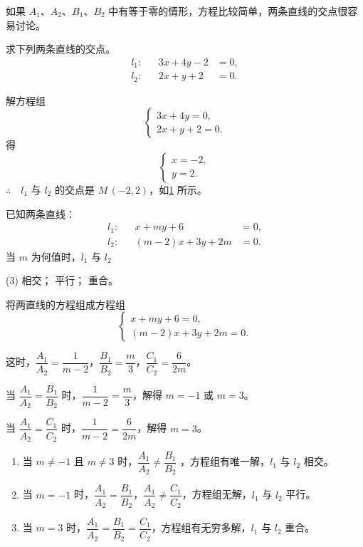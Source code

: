 \bigskip 如果 $A_1$、$A_2$、$B_1$、$B_2$ 中有等于零的情形，方程比较简单，两条直线的交点很容易讨论。
\begin{example}
  求下列两条直线的交点。
  \begin{align*}
    l_1:&&3x+4y-2 & = 0,\\
    l_2:&&2x+y+2 & = 0.
  \end{align*}
\end{example}
\begin{solution}
  解方程组
  \[\begin{cases} 3x+4y=0,\\2x+y+2=0. \end{cases}\]
  得
  \[\begin{cases} x=-2,\\y=2. \end{cases}\]
  $\therefore \quad l_1$ 与 $l_2$ 的交点是 $M\,(-2,2)$，如\cref{fig:1-33} 所示。
\end{solution}
\begin{figure}
  \caption{}\label{fig:1-33}
\end{figure}
\begin{example}
  已知两条直线：
  \begin{align*}
    l_1:&&x+my+6 & = 0,\\
    l_2:&&(m-2)x+3y+2m & = 0.
  \end{align*}
  当 $m$ 为何值时，${l}_{1}$ 与 ${l}_{2}$ 
  \begin{tasks}(3)
    \task 相交；
    \task 平行；
    \task 重合。
  \end{tasks}
\end{example}
\begin{solution}
  将两直线的方程组成方程组
  \[\begin{cases} x+my+6=0,\\(m-2)x+3y+2m=0. \end{cases}\]

  这时，$\dfrac{A_1}{A_2}=\dfrac{1}{m - 2}$，$\dfrac{B_1}{B_2} = \dfrac{m}{3}$，$\dfrac{C_1}{C_2} = \dfrac{6}{2m}$。

  \medskip 当 $\dfrac{A_1}{A_2}=\dfrac{B_1}{B_2}$ 时，$\dfrac{1}{m-2} = \dfrac{m}{3}$，解得 $m=-1$ 或 $m=3$。

\medskip 当 $\dfrac{A_1}{A_2}=\dfrac{C_1}{C_2}$ 时，$\dfrac{1}{m-2} = \dfrac{6}{2m}$，解得 $m=3$。
\begin{enumerate}
  \item 当 $m\neq-1$ 且 $m\neq 3$ 时，$\dfrac{A_1}{A_2} \neq \dfrac{B_1}{B_2}$ ，方程组有唯一解，$l_1$ 与 $l_2$ 相交。
  \item 当 $m=-1$ 时，$\dfrac{A_1}{A_2}= \dfrac{B_1}{B_2}$，$\dfrac{A_1}{A_2} \neq \dfrac{C_1}{C_2}$，方程组无解，$l_1$ 与 $l_2$ 平行。
  \item 当 $m=3$ 时，$\dfrac{A_1}{A_2}= \dfrac{B_1}{B_2}= \dfrac{C_1}{C_2}$，方程组有无穷多解，$l_1$ 与 $l_2$  重合。
\end{enumerate}
\end{solution}

